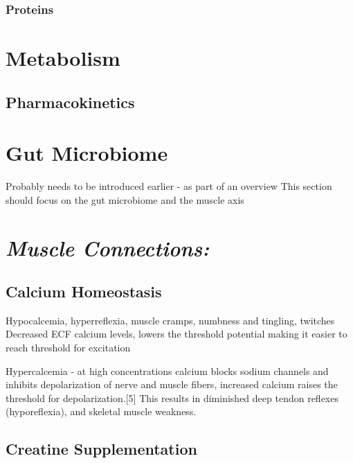 \subsubsection{Proteins}


\section{Metabolism}


\subsection{Pharmacokinetics}


\section{Gut Microbiome}

Probably needs to be introduced earlier - as part of an overview
This section should focus on the gut microbiome and the muscle axis


\section{\textit{Muscle Connections:}}

\subsection{Calcium Homeostasis}
Hypocalcemia, hyperreflexia, muscle cramps, numbness and tingling, twitches
Decreased ECF calcium levels, lowers the threshold potential making it easier to reach threshold for excitation

Hypercalcemia - at high concentrations calcium blocks sodium channels and inhibits depolarization of nerve and muscle fibers, increased calcium raises the threshold for depolarization.[5] This results in diminished deep tendon reflexes (hyporeflexia), and skeletal muscle weakness.

\subsection{Creatine Supplementation}

\printbibliography[heading=subbibintoc]